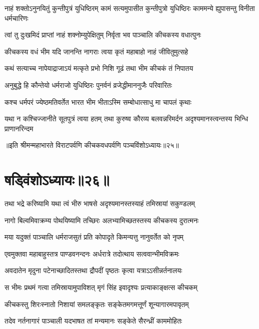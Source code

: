 \threelineshloka
{नाहं शक्तोऽनुनयितुं कुन्तीपुत्रं युधिष्ठिरम्}
{कामं सत्यमुपासीत कुन्तीपुत्रो युधिष्ठिरः}
{काममन्ये ह्युपासन्तु विनीता धर्मचारिणः}


\twolineshloka
{त्वां तु दुःखमिदं प्राप्तां नाहं शक्नोम्युपेक्षितुम्}
{निर्वृता भव पाञ्चालि कीचकस्य वधात्पुनः}




\twolineshloka
{कीचकस्य वधं भीम यदि जानन्ति नागराः}
{त्वया कृतं महाबाहो नाहं जीवितुमुत्सहे}


\twolineshloka
{कथं सत्याच्च नापेयाद्राजाऽयं मत्कृते प्रभो}
{निशि गूढं तथा भीम कीचकं तं निपातय}


\twolineshloka
{अनुबुद्धे हि कौन्तेयो धर्मराजो युधिष्ठिरः}
{पुनर्वनं व्रजेद्धीमाननुजैः परिवारितः}


\twolineshloka
{कश्च धर्मपरं ज्येष्ठमतिवर्तेत भारत}
{भीम भीताऽस्मि सम्बोधात्साधु मा चापलं कृथाः}


\threelineshloka
{यथा न कश्चिज्जानीते सूतपुत्रं त्वया हतम्}
{तथा कुरुष्व कौरव्य बलवन्नरिमर्दन}
{अदृश्यमानस्त्वन्तस्य भिन्धि प्राणानरिन्दम}

॥इति श्रीमन्महाभारते विराटपर्वणि कीचकवधपर्वणि पञ्चविंशोऽध्यायः॥२५॥

\chapter{षड्विंशोऽध्यायः॥२६॥}

\twolineshloka
{तथा भद्रे करिष्यामि यथा त्वं भीरु भाषसे}
{अदृश्यमानस्तस्याहं तमिस्रायां सकुण्डलम्}


\twolineshloka
{नागो बिल्वमिवाक्रम्य पोथयिष्यामि तच्छिरः}
{अलभ्यामिच्छतस्तस्य कीचकस्य दुरात्मनः}


\twolineshloka
{मया यदुक्तं पाञ्चालि धर्मराजसुतं प्रति}
{कोपादृते किमन्यत्तु नानुवर्तेत को नृपम्}



\twolineshloka
{एवमुक्तवा महाबाहुस्तत्र पाण्डवनन्दनः}
{अर्धरात्रे तदोत्थाय सत्ववान्भीमविक्रमः}


\twolineshloka
{अवदातेन मृदुना पटेनाच्छादितस्तथा}
{द्रौपदीं पृष्ठतः कृत्वा यत्राऽऽसीन्नर्तनालयः}


\twolineshloka
{स भीमः प्रथमं गत्वा तमिस्रायामुपाविशत्}
{मृगं सिंह इवादृश्यः प्रत्याकाङ्क्षत्स कीचकम्}


\twolineshloka
{कीचकस्तु शिरःस्नातो निशायां समलङ्कृतः}
{सङ्केतमगमत्तूर्णं शून्यागारमपावृतम्}


\twolineshloka
{तदेव नर्तनागारं पाञ्चाली यदभाषत}
{तां मन्यमानः सङ्केते सैरन्ध्रीं काममोहितः}


